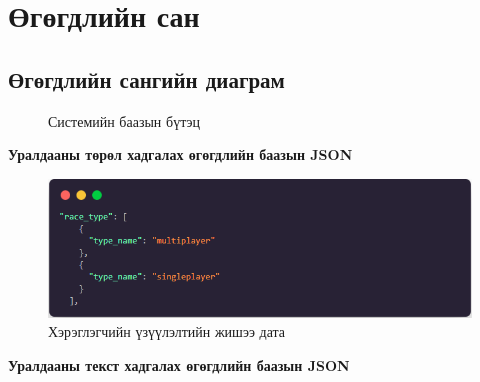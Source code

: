 


\clearpage
\section{Өгөгдлийн сан}

\subsection{Өгөгдлийн сангийн диаграм}
\begin{figure}[h]
	\centering
	
	\caption{Системийн баазын бүтэц}
	\label{fig:erd}
\end{figure}

\pagebreak

\textbf{Уралдааны төрөл хадгалах өгөгдлийн баазын JSON}

\begin{figure}[h]
	\centering
	\includegraphics[width=15cm]{images/race_type_json.png}
	\caption{Хэрэглэгчийн үзүүлэлтийн жишээ дата}
	\label{fig:erd}
\end{figure}

\textbf{Уралдааны текст хадгалах өгөгдлийн баазын JSON}

